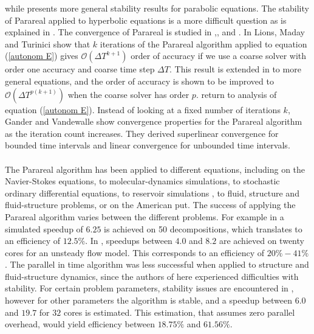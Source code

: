 while \cite{bal2005convergence} presents more general stability results for parabolic equations. The stability of Parareal applied to hyperbolic equations is a more difficult question as is explained in \cite{dai2013stable}. The convergence of Parareal is studied in \cite{lions2001resolution},\cite{bal2005convergence},\cite{gander2007analysis} and \cite{gander2007superlinear}. In \cite{lions2001resolution} Lions, Maday and Turinici show that $k$ iterations of the Parareal algorithm applied to equation (\ref{autonom E}) gives $\mathcal{O}(\Delta T^{k+1})$ order of accuracy if we use a coarse solver with order one accuracy and coarse time step $\Delta T$. This result is extended in \cite{bal2005convergence} to more general equations, and the order of accuracy is shown to be improved to $\mathcal{O}(\Delta T^{p(k+1)})$ when the coarse solver has order $p$. \cite{gander2007analysis,gander2007superlinear} return to analysis of equation (\ref{autonom E}). Instead of looking at a fixed number of iterations $k$, Gander and Vandewalle show convergence properties for the Parareal algorithm as the iteration count increases. They derived superlinear convergence for bounded time intervals and linear convergence for unbounded time intervals.
\\
\\
The Parareal algorithm has been applied to different equations, including on the Navier-Stokes equations\cite{fischer2005parareal}, to molecular-dynamics simulations\cite{baffico2002parallel}, to stochastic ordinary differential equations\cite{bal2003parallelization}, to reservoir simulations \cite{garrido2005convergent}, to fluid, structure and fluid-structure problems\cite{farhat2003time}, or on the American put\cite{bal2002parareal}. The success of applying the Parareal algorithm varies between the different problems. For example in \cite{bal2002parareal} a simulated speedup of $6.25$ is achieved on 50 decompositions, which translates to an efficiency of $12.5\%$. In \cite{farhat2003time}, speedups between $4.0$ and $8.2$ are achieved on twenty cores for an unsteady flow model. This corresponds to an efficiency of $20\%-41\%$. The parallel in time algorithm was less successful when applied to structure and fluid-structure dynamics, since the authors of \cite{farhat2003time} here experienced difficulties with stability. For certain problem parameters, stability issues are encountered in \cite{fischer2005parareal}, however for other parameters the algorithm is stable, and a speedup between $6.0$ and $19.7$ for $32$ cores is estimated. This estimation, that assumes zero parallel overhead, would yield efficiency between $18.75\%$ and $61.56\%$. 
